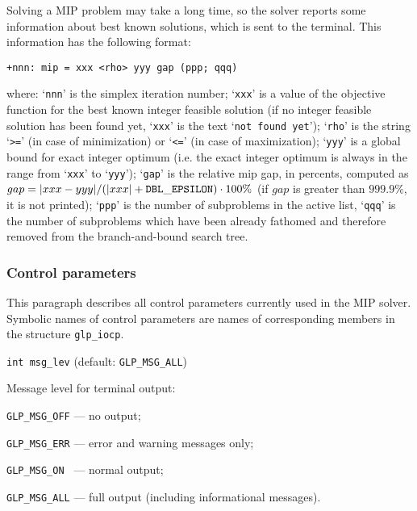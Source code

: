 
Solving a MIP problem may take a long time, so the solver reports some
information about best known solutions, which is sent to the terminal.
This information has the following format:

\begin{verbatim}
+nnn: mip = xxx <rho> yyy gap (ppp; qqq)
\end{verbatim}

\noindent
where: `\verb|nnn|' is the simplex iteration number; `\verb|xxx|' is a
value of the objective function for the best known integer feasible
solution (if no integer feasible solution has been found yet,
`\verb|xxx|' is the text `\verb|not found yet|'); `\verb|rho|' is the
string `\verb|>=|' (in case of minimization) or `\verb|<=|' (in case of
maximization); `\verb|yyy|' is a global bound for exact integer optimum
(i.e. the exact integer optimum is always in the range from `\verb|xxx|'
to `\verb|yyy|'); `\verb|gap|' is the relative mip gap, in percents,
computed as $gap=|xxx-yyy|/(|xxx|+{\tt DBL\_EPSILON})\cdot 100\%$ (if
$gap$ is greater than $999.9\%$, it is not printed); `\verb|ppp|' is the
number of subproblems in the active list, `\verb|qqq|' is the number of
subproblems which have been already fathomed and therefore removed from
the branch-and-bound search tree.

\newpage

\subsubsection{Control parameters}

This paragraph describes all control parameters currently used in the
MIP solver. Symbolic names of control parameters are names of
corresponding members in the structure \verb|glp_iocp|.

\bigskip\vspace*{-2pt}

{\tt int msg\_lev} (default: {\tt GLP\_MSG\_ALL})

Message level for terminal output:

\verb|GLP_MSG_OFF| --- no output;

\verb|GLP_MSG_ERR| --- error and warning messages only;

\verb|GLP_MSG_ON | --- normal output;

\verb|GLP_MSG_ALL| --- full output (including informational messages).

\bigskip\vspace*{-2pt}

